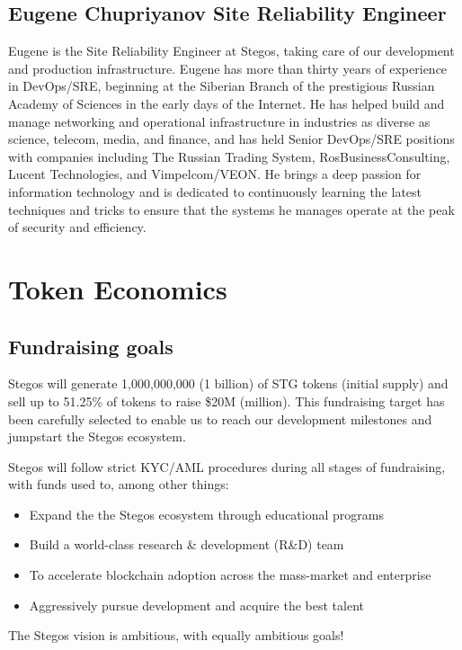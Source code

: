\documentclass[8pt,fleqn,openany]{book}
\begin{document}
\section{Eugene Chupriyanov Site Reliability Engineer}
Eugene is the Site Reliability Engineer at Stegos, taking care of our development and production infrastructure. Eugene has more than thirty years of experience in DevOps/SRE, beginning at the Siberian Branch of the prestigious Russian Academy of Sciences in the early days of the Internet. He has helped build and manage networking and operational infrastructure in industries as diverse as science, telecom, media, and finance, and has held Senior DevOps/SRE positions with companies including The Russian Trading System, RosBusinessConsulting, Lucent Technologies, and Vimpelcom/VEON. He brings a deep passion for information technology and is dedicated to continuously learning the latest techniques and tricks to ensure that the systems he manages operate at the peak of security and efficiency. 

\chapter{Token Economics}\label{app:token-economics}

\section{Fundraising goals}
Stegos will generate 1,000,000,000 (1 billion) of STG tokens (initial supply) and sell up to 51.25\% of tokens to raise \$20M (million). This fundraising target has been carefully selected to enable us to reach our development milestones and jumpstart the Stegos ecosystem.

Stegos will follow strict KYC/AML procedures during all stages of fundraising, with funds used to, among other things:

\begin{itemize}
	\item Expand the the Stegos ecosystem through educational programs
	\item Build a world-class research \& development (R\&D) team
	\item To accelerate blockchain adoption across the mass-market and enterprise
	\item Aggressively pursue development and acquire the best talent
\end{itemize}

The Stegos vision is ambitious, with equally ambitious goals!
\end{document}
